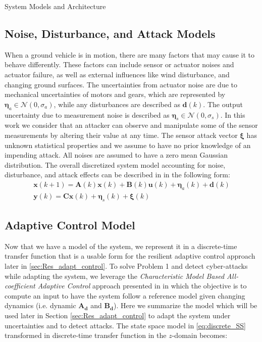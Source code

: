 \begin{section}{System Models and Architecture}
 \subsection{Noise, Disturbance, and Attack Models}
When a ground vehicle is in motion, there are many factors that may cause it to behave differently. These factors can include sensor or actuator noises and actuator failure, as well as external influences like wind disturbance, and changing ground surfaces. The uncertainties from actuator noise are due to mechanical uncertainties of motors and gears, which are represented by $\bm{\eta}_a \in \mathcal{N}(0,\sigma_a)$, while any disturbances are described as $\bm{d}(k)$. The output uncertainty due to measurement noise is described as $\bm{\eta}_s \in \mathcal{N}(0,\sigma_s)$. In this work we consider that an attacker can observe and manipulate some of the sensor measurements by altering their value at any time. The sensor attack vector $\bm{\xi}$ has unknown statistical properties and we assume to have no prior knowledge of an impending attack. All noises are assumed to have a zero mean Gaussian distribution. The overall discretized system model accounting for noise, disturbance, and attack effects  can be described in in the following form:
    \begin{equation}
    \begin{split}
    \label{eq:discrete_SS}
	\bm{x}(k+1)=\bm{A}(k)\bm{x}(k)+\bm{B}(k)\bm{u}(k)+\bm{\eta}_a(k)+\bm{d}(k) \\
	\bm{y}(k)=\bm{C}\bm{x}(k)+\bm{\eta}_s(k)+\bm{\xi}(k)
	\end{split}
	\end{equation}



\subsection{Adaptive Control Model}
Now that we have a model of the system, we represent it in a discrete-time transfer function that is a usable form for the resilient adaptive control approach later in \ref{sec:Res_adapt_control}. To solve Problem 1 and detect cyber-attacks while adapting the system, we leverage the \textit{Characteristic Model Based All-coefficient Adaptive Control} approach presented in \cite{4106038} in which the objective is to compute an input to have the system follow a reference model given changing dynamics (i.e. dynamic $\bm{A_d}$ and  $\bm{B_d}$). Here we summarize the model which will be used later in Section \ref{sec:Res_adapt_control} to adapt the system under uncertainties and to detect attacks. The state space model in \eqref{eq:discrete_SS} transformed in discrete-time transfer function in the $z$-domain becomes:


\end{section}
